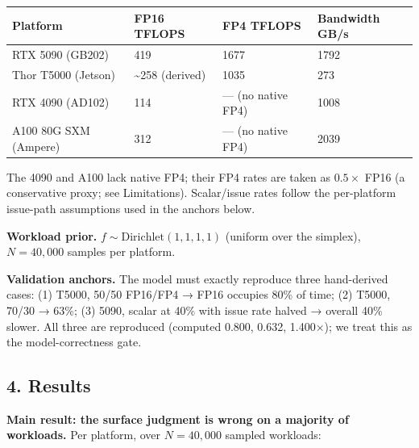 \documentclass[11pt]{article}
\begin{document}
{{
\begin{longtable}{@{}llll@{}}
\toprule\noalign{}
Platform & FP16 TFLOPS & FP4 TFLOPS & Bandwidth GB/s \\
\midrule\noalign{}
\endhead
\bottomrule\noalign{}
\endlastfoot
RTX 5090 (GB202) & 419 & 1677 & 1792 \\
Thor T5000 (Jetson) & \textasciitilde258 (derived) & 1035 & 273 \\
RTX 4090 (AD102) & 114 & --- (no native FP4) & 1008 \\
A100 80G SXM (Ampere) & 312 & --- (no native FP4) & 2039 \\
\end{longtable}
}

The 4090 and A100 lack native FP4; their FP4 rates are taken as \(0.5 \times\) FP16 (a conservative proxy; see Limitations). Scalar/issue rates follow the per-platform issue-path assumptions used in the anchors below.

\textbf{Workload prior.} \(f \sim \text{Dirichlet}(1,1,1,1)\) (uniform over the simplex), \(N = 40{,}000\) samples per platform.

\textbf{Validation anchors.} The model must exactly reproduce three hand-derived cases: (1) T5000, 50/50 FP16/FP4 → FP16 occupies 80\% of time; (2) T5000, 70/30 → 63\%; (3) 5090, scalar at 40\% with issue rate halved → overall 40\% slower. All three are reproduced (computed 0.800, 0.632, 1.400×); we treat this as the model-correctness gate.

\subsection{4. Results}\label{results}

\textbf{Main result: the surface judgment is wrong on a majority of workloads.} Per platform, over \(N=40{,}000\) sampled workloads:

}
\end{document}
